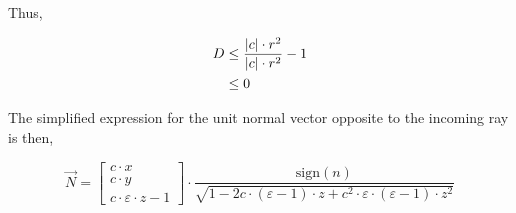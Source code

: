Thus,

\begin{equation} \begin{split}
D &\leq \frac{\abs{c} \cdot r^2}{\abs{c} \cdot r^2} -1 \\
  &\leq 0
\end{split} \end{equation}

The simplified expression for the unit normal vector opposite to the incoming
ray is then,

\begin{equation}
\overrightarrow{N} =
\begin{bmatrix}
c \cdot x \\ c \cdot y \\ c \cdot \varepsilon \cdot z - 1
\end{bmatrix} \cdot
\frac{\textrm{sign}(n)}{
\sqrt{1 - 2 c \cdot (\varepsilon - 1) \cdot z + c^2 \cdot \varepsilon \cdot
         (\varepsilon - 1) \cdot z^2}}
\end{equation}

